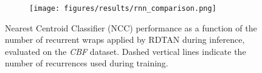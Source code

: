 \begin{figure}[t]
    \centering
    \def\figwidth{0.9\linewidth } %
    \begin{subfigure}{\figwidth}
     \centering
    {\texttt{[image: figures/results/rnn\_comparison.png]}}
    \end{subfigure}

    \caption{Nearest Centroid Classifier (NCC) performance as a function of the number of recurrent wraps applied by RDTAN during inference, evaluated on the \textit{CBF} dataset. 
    Dashed vertical lines indicate the number of recurrences used during training.}
    \label{fig:rnn:compare}
    \end{figure}
